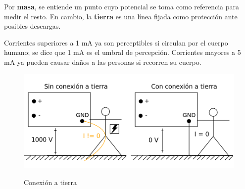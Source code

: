 \documentclass{article}
\begin{document}
Por \textbf{masa}, se entiende un punto cuyo potencial se toma como referencia para medir el resto.
En cambio, la \textbf{tierra} es una línea fijada como protección ante posibles descargas.

Corrientes superiores a 1 mA ya son perceptibles si circulan por el cuerpo humano; se dice que 1 mA
es el umbral de percepción. Corrientes mayores a 5 mA ya pueden causar daños a las personas si recorren
su cuerpo.

\begin{figure}[t]
\caption{Conexión a tierra}
\includegraphics[scale=0.25]{img/teo_fig004_tierra.png} 
\centering
\label{fig:004_tierra}
\end{figure}
\end{document}
